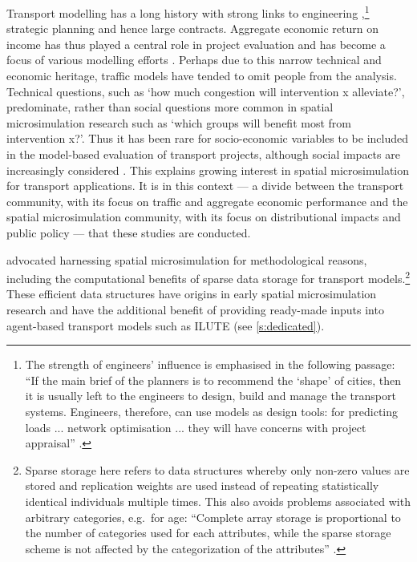 Transport modelling has a long history with strong links to engineering
,\footnote{The strength of engineers'
influence is emphasised in the following passage: ``If the main brief
of the planners is to recommend the `shape' of cities,
then it is usually left to the engineers to design, build and manage the
transport systems. Engineers,
therefore, can use models as design tools: for predicting loads ...
network optimisation ... they will have concerns with project
appraisal'' \citep[p.~16]{Wilson1998-past}.}
strategic planning \citep{Wilson1998-past} and hence large contracts.
Aggregate economic return on income has thus played a central role in
project evaluation and has become a focus of various modelling efforts
\citep{Masser1992}.
Perhaps due to this narrow technical and economic heritage, traffic models
have tended to omit people from the analysis. Technical
questions, such as `how much congestion will intervention x alleviate?',
predominate, rather
than social questions more common in spatial microsimulation research
such as `which groups will benefit most from intervention x?'.
Thus it has been rare for socio-economic variables to be included in
the model-based evaluation of transport projects, although
social impacts are increasingly considered \citep{Masser1992, Tribby2012}.
This explains growing interest
in spatial microsimulation for transport applications.
It is in this context --- a divide between the transport community, with its focus
on traffic and aggregate economic performance and the spatial microsimulation
community, with its focus on distributional impacts and public policy --- that these
studies are conducted. 


\citet{Pritchard2012} advocated harnessing spatial microsimulation
for methodological reasons, including the computational benefits of sparse data storage
for transport models.\footnote{Sparse storage here refers to data structures
whereby only non-zero values are stored and replication
weights are used instead of repeating statistically identical individuals multiple
times. This also avoids problems associated with arbitrary categories, e.g.~for
age: ``Complete array storage is proportional to the number of categories used
for each attributes, while the sparse storage scheme is not affected by the
categorization of the attributes'' \citep[p.~691]{Pritchard2012}.} These
efficient %
data structures have origins in early spatial microsimulation
research \citep{Holm1987, Williamson1998} and have the additional benefit
of providing ready-made inputs into agent-based transport models such as
ILUTE (see \cref{s:dedicated}).


